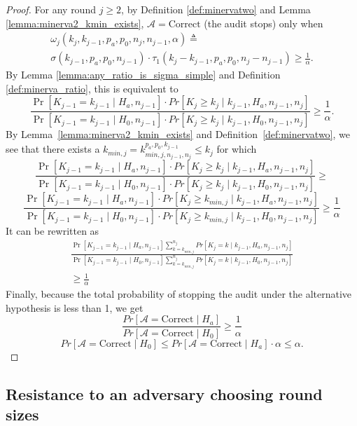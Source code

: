 \begin{proof}
For any round $j\ge 2$, by Definition \ref{def:minervatwo}
and Lemma \ref{lemma:minerva2_kmin_exists},
$\mathcal{A}=\text{Correct}$ (the audit stops) only when
\begin{equation*}
\begin{aligned}
\omega_{j}(k_{j}, k_{j-1}, p_a, p_0, n_{j}, n_{j-1}, \alpha )\triangleq\\
\sigma(k_{j-1},p_a,p_0,n_{j-1})\cdot \tau_1(k_{j}-k_{j-1},p_a,p_0,n_j-n_{j-1})
\ge \frac{1}{\alpha}.
\end{aligned}
\end{equation*}
By Lemma \ref{lemma:any_ratio_is_sigma_simple}
and Definition \ref{def:minerva_ratio}, this is equivalent to
$$
\frac{\Pr[K_{j-1} = {k_{j-1}} \mid H_a, n_{j-1}]\cdot Pr[K_{j} \ge k_{j} \mid {k_{j-1}}, H_a, n_{j-1}, n_{j}]}{\Pr[K_{j-1} = {k_{j-1}} \mid H_0, n_{j-1}]\cdot Pr[K_{j} \ge k_{j} \mid {k_{j-1}}, H_0, n_{j-1}, n_{j}]}\ge \frac{1}{\alpha}.
$$
By Lemma~\ref{lemma:minerva2_kmin_exists} and Definition~\ref{def:minervatwo},
we see that there exists a $k_{min, j} = k_{min, j, n_{j-1}, n_j}^{p_a, p_0, k_{j-1}} \leq k_j$ 
for which
$$
\frac{\Pr[K_{j-1} = {k_{j-1}} \mid H_a, n_{j-1}]\cdot Pr[K_{j} \ge k_{j} \mid {k_{j-1}}, H_a, n_{j-1}, n_{j}]}{\Pr[K_{j-1} = {k_{j-1}} \mid H_0, n_{j-1}]\cdot Pr[K_{j} \ge k_{j} \mid {k_{j-1}}, H_0, n_{j-1}, n_{j}]}\ge
$$
$$
\frac{\Pr[K_{j-1} = {k_{j-1}} \mid H_a, n_{j-1}]\cdot Pr[K_{j} \ge k_{min, j} \mid {k_{j-1}}, H_a, n_{j-1}, n_{j}]}{\Pr[K_{j-1} = {k_{j-1}} \mid H_0, n_{j-1}]\cdot Pr[K_{j} \ge k_{min, j} \mid {k_{j-1}}, H_0, n_{j-1}, n_{j}]} \ge 
\frac{1}{\alpha}
$$
It can be rewritten as
\begin{equation*}
\begin{aligned}
\frac{\Pr[K_{j-1} = {k_{j-1}} \mid H_a, n_{j-1}] \sum_{{k} = k_{min, j}}^{n_j} Pr[K_{j} = k \mid {k_{j-1}}, H_a, n_{j-1}, n_{j}]}{\Pr[K_{j-1} = {k_{j-1}} \mid H_0, n_{j-1}]\sum_{{k} = k_{min, j}}^{n_j} Pr[K_{j} = k \mid {k_{j-1}}, H_0, n_{j-1}, n_{j}]} 
\\ \ge \frac{1}{\alpha}
\end{aligned}
\end{equation*}
Finally, because the total probability of stopping the audit under
the alternative hypothesis is less than 1, we get
$$
\frac{Pr[\mathcal{A}=\text{Correct} \mid H_a]}{Pr[\mathcal{A}=\text{Correct} \mid H_0]}\ge \frac{1}{\alpha}
$$
$$
Pr[\mathcal{A}=\text{Correct} \mid H_0]
\le
Pr[\mathcal{A}=\text{Correct} \mid H_a] \cdot \alpha
\le
\alpha.
$$
\end{proof}

\subsection{Resistance to an adversary choosing round sizes}
\label{sec:adversary}

